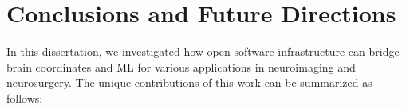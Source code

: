 \chapter{Conclusions and Future Directions}
\newpage
\sloppy
In this dissertation, we investigated how open software infrastructure can bridge brain coordinates and ML for various applications in neuroimaging and neurosurgery. The unique contributions of this work can be summarized as follows: 
